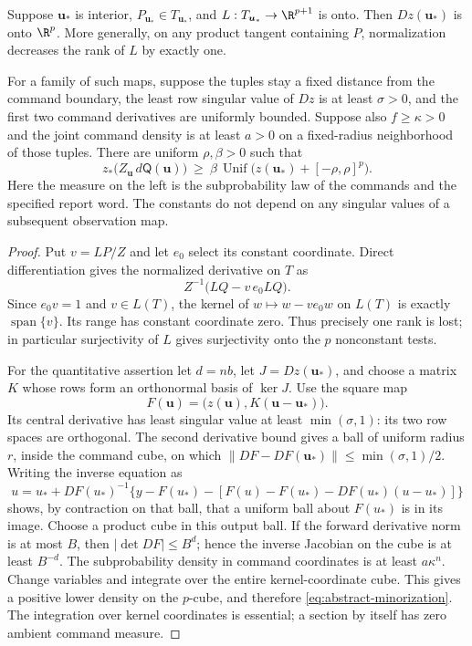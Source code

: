 \begin{proposition}\label{prop:product-criterion}
Suppose $\boldsymbol u_*$ is interior, $P_{\boldsymbol u_*}\in
T_{\boldsymbol u_*}$, and $L:T_{\boldsymbol u_*}\to\R^{p+1}$ is
onto. Then $Dz(\boldsymbol u_*)$ is onto $\R^p$. More generally, on
any product tangent containing $P$, normalization decreases the rank of
$L$ by exactly one.

For a family of such maps, suppose the tuples stay a fixed distance from
the command boundary, the least row singular value of $Dz$ is at least
$\sigma>0$, and the first two command derivatives are uniformly bounded.
Suppose also $f\ge\kappa>0$ and the joint command density is at least
$a>0$ on a fixed-radius neighborhood of those tuples. There are uniform $\rho,\beta>0$ such that
\begin{equation}\label{eq:abstract-minorization}
 z_*\bigl(Z_{\boldsymbol u}\,d\mathsf Q(\boldsymbol u)\bigr)
 \ \ge\ \beta\,\operatorname{Unif}
       \bigl(z(\boldsymbol u_*)+[-\rho,\rho]^p\bigr).
\end{equation}
Here the measure on the left is the subprobability law of the commands
and the specified report word. The constants do not depend on any
singular values of a subsequent observation map.
\end{proposition}
\begin{proof}
Put $v=LP/Z$ and let $e_0$ select its constant coordinate. Direct
differentiation gives the normalized derivative on $T$ as
\[
 Z^{-1}\bigl(LQ-v\,e_0LQ\bigr).
\]
Since $e_0v=1$ and $v\in L(T)$, the kernel of $w\mapsto w-v e_0w$
on $L(T)$ is exactly $\operatorname{span}\{v\}$. Its range has
constant coordinate zero. Thus precisely one rank is lost; in particular
surjectivity of $L$ gives surjectivity onto the $p$ nonconstant tests.

For the quantitative assertion let $d=nb$, let $J=Dz(\boldsymbol u_*)$,
and choose a matrix $K$ whose rows form an orthonormal basis of $\ker J$.
Use the square map
\[
 F(\boldsymbol u)=\bigl(z(\boldsymbol u),
               K(\boldsymbol u-\boldsymbol u_*)\bigr).
\]
Its central derivative has least singular value at least
$\min(\sigma,1)$: its two row spaces are orthogonal. The second
 derivative bound gives a ball of uniform radius $r$, inside the command
cube, on which
$\|DF-DF(\boldsymbol u_*)\|\le\min(\sigma,1)/2$.
Writing the inverse equation as
\[
 u=u_*+DF(u_*)^{-1}\{y-F(u_*)-[F(u)-F(u_*)-DF(u_*)(u-u_*)]\}
\]
shows, by contraction on that ball, that a uniform ball about $F(u_*)$
is in its image. Choose a product cube in this output ball. If the forward
 derivative norm is at most $B$, then $|\det DF|\le B^d$; hence the
inverse Jacobian on the cube is at least $B^{-d}$. The subprobability
density in command coordinates is at least $a\kappa^n$. Change variables
and integrate over the entire kernel-coordinate cube. This gives a
positive lower density on the $p$-cube, and therefore
\eqref{eq:abstract-minorization}. The integration over kernel coordinates
is essential; a section by itself has zero ambient command measure.
\end{proof}

